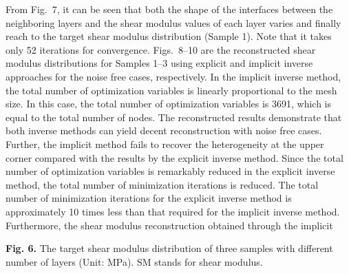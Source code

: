 \documentclass[11pt]{article}
\begin{document}
From Fig.~7, it can be seen that both the shape of the interfaces
between the neighboring layers and the shear modulus values of each
layer varies and finally reach to the target shear modulus
distribution (Sample 1). Note that it takes only 52 iterations for
convergence. Figs.~8--10 are the reconstructed shear modulus
distributions for Samples 1--3 using explicit and implicit inverse
approaches for the noise free cases, respectively. In the implicit
inverse method, the total number of optimization variables is
linearly proportional to the mesh size. In this case, the total
number of optimization variables is 3691, which is equal to the total
number of nodes. The reconstructed results demonstrate that both
inverse methods can yield decent reconstruction with noise free
cases. Further, the implicit method fails to recover the
heterogeneity at the upper corner compared with the results by the
explicit inverse method. Since the total number of optimization
variables is remarkably reduced in the explicit inverse method, the
total number of minimization iterations is reduced. The total number
of minimization iterations for the explicit inverse method is
approximately 10 times less than that required for the implicit
inverse method. Furthermore, the shear modulus reconstruction
obtained through the implicit

\vspace{1em}
\begin{center}
\end{center}
\vspace{0.3em}
\begin{center}
\textbf{Fig. 6.} The target shear modulus distribution of three
samples with different number of layers (Unit: MPa). SM stands for
shear modulus.
\end{center}
\end{document}
